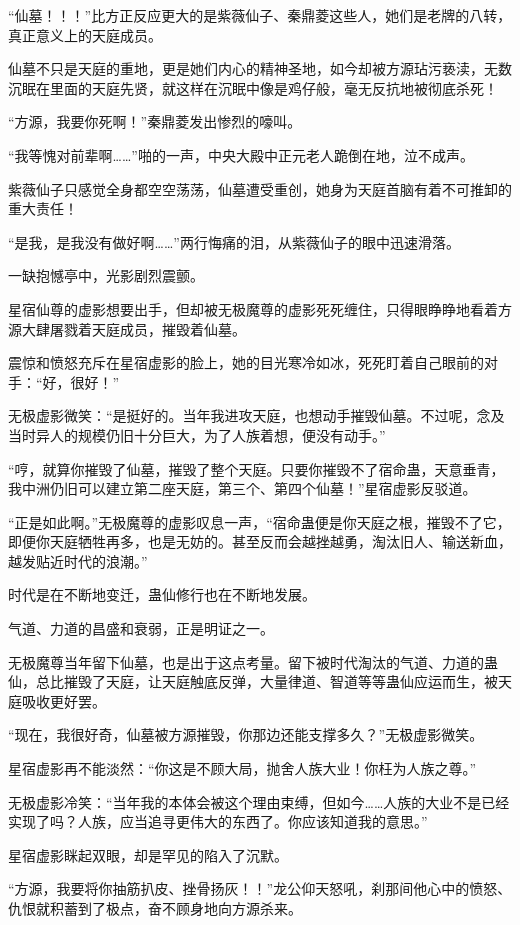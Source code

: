 \begin{this_body}
“仙墓！！！”比方正反应更大的是紫薇仙子、秦鼎菱这些人，她们是老牌的八转，真正意义上的天庭成员。

仙墓不只是天庭的重地，更是她们内心的精神圣地，如今却被方源玷污亵渎，无数沉眠在里面的天庭先贤，就这样在沉眠中像是鸡仔般，毫无反抗地被彻底杀死！

“方源，我要你死啊！”秦鼎菱发出惨烈的嚎叫。

“我等愧对前辈啊……”啪的一声，中央大殿中正元老人跪倒在地，泣不成声。

紫薇仙子只感觉全身都空空荡荡，仙墓遭受重创，她身为天庭首脑有着不可推卸的重大责任！

“是我，是我没有做好啊……”两行悔痛的泪，从紫薇仙子的眼中迅速滑落。

一缺抱憾亭中，光影剧烈震颤。

星宿仙尊的虚影想要出手，但却被无极魔尊的虚影死死缠住，只得眼睁睁地看着方源大肆屠戮着天庭成员，摧毁着仙墓。

震惊和愤怒充斥在星宿虚影的脸上，她的目光寒冷如冰，死死盯着自己眼前的对手：“好，很好！”

无极虚影微笑：“是挺好的。当年我进攻天庭，也想动手摧毁仙墓。不过呢，念及当时异人的规模仍旧十分巨大，为了人族着想，便没有动手。”

“哼，就算你摧毁了仙墓，摧毁了整个天庭。只要你摧毁不了宿命蛊，天意垂青，我中洲仍旧可以建立第二座天庭，第三个、第四个仙墓！”星宿虚影反驳道。

“正是如此啊。”无极魔尊的虚影叹息一声，“宿命蛊便是你天庭之根，摧毁不了它，即便你天庭牺牲再多，也是无妨的。甚至反而会越挫越勇，淘汰旧人、输送新血，越发贴近时代的浪潮。”

时代是在不断地变迁，蛊仙修行也在不断地发展。

气道、力道的昌盛和衰弱，正是明证之一。

无极魔尊当年留下仙墓，也是出于这点考量。留下被时代淘汰的气道、力道的蛊仙，总比摧毁了天庭，让天庭触底反弹，大量律道、智道等等蛊仙应运而生，被天庭吸收更好罢。

“现在，我很好奇，仙墓被方源摧毁，你那边还能支撑多久？”无极虚影微笑。

星宿虚影再不能淡然：“你这是不顾大局，抛舍人族大业！你枉为人族之尊。”

无极虚影冷笑：“当年我的本体会被这个理由束缚，但如今……人族的大业不是已经实现了吗？人族，应当追寻更伟大的东西了。你应该知道我的意思。”

星宿虚影眯起双眼，却是罕见的陷入了沉默。

“方源，我要将你抽筋扒皮、挫骨扬灰！！”龙公仰天怒吼，刹那间他心中的愤怒、仇恨就积蓄到了极点，奋不顾身地向方源杀来。


\end{this_body}
